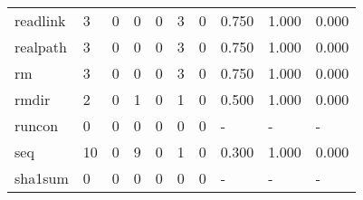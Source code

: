 \begin{longtable}{lp{2.0cm}p{2.0cm}p{2.0cm}p{2.0cm}p{2.0cm}p{2.0cm}p{2.0cm}p{2.0cm}p{2.0cm}}
readlink  &                      3 &                                             0 &                                            0 &                                           0 &                                            3 &                                          0 &                                0.750 &                                  1.000 &                                0.000 \\
realpath  &                      3 &                                             0 &                                            0 &                                           0 &                                            3 &                                          0 &                                0.750 &                                  1.000 &                                0.000 \\
rm        &                      3 &                                             0 &                                            0 &                                           0 &                                            3 &                                          0 &                                0.750 &                                  1.000 &                                0.000 \\
rmdir     &                      2 &                                             0 &                                            1 &                                           0 &                                            1 &                                          0 &                                0.500 &                                  1.000 &                                0.000 \\
runcon    &                      0 &                                             0 &                                            0 &                                           0 &                                            0 &                                          0 &                                    - &                                      - &                                    - \\
seq       &                     10 &                                             0 &                                            9 &                                           0 &                                            1 &                                          0 &                                0.300 &                                  1.000 &                                0.000 \\
sha1sum   &                      0 &                                             0 &                                            0 &                                           0 &                                            0 &                                          0 &                                    - &                                      - &                                    - \\

\end{longtable}
